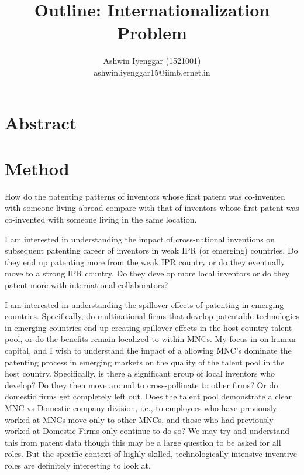 \documentclass[12pt]{article}
\begin{document}
\title{Outline: Internationalization Problem}
\author{Ashwin Iyenggar  (1521001) \\ ashwin.iyenggar15@iimb.ernet.in} 


\maketitle
\thispagestyle{empty}

\section{Abstract}


\section{Method}

How do the patenting patterns of inventors whose first patent was co-invented with someone living abroad compare with that of inventors whose first patent was co-invented with someone living in the same location.

I am interested in understanding the impact of cross-national inventions on subsequent patenting career of inventors in weak IPR (or emerging) countries. Do they end up patenting more from the weak IPR country or do they eventually move to a strong IPR country. Do they develop more local inventors or do they patent more with international collaborators?

I am interested in understanding the spillover effects of patenting in emerging countries. Specifically, do multinational firms that develop patentable technologies in emerging countries end up creating spillover effects in the host country talent pool, or do the benefits remain localized to within MNCs. My focus in on human capital, and I wish to understand the impact of a allowing MNC's dominate the patenting process in emerging markets on the quality of the talent pool in the host country. Specifically, is there a significant group of local inventors who develop? Do they then move around to cross-pollinate to other firms? Or do domestic firms get completely left out. Does the talent pool demonstrate a clear MNC vs Domestic company division, i.e., to employees who have previously worked at MNCs move only to other MNCs, and those who had previously worked at Domestic Firms only continue to do so? We may try and understand this from patent data though this may be a large question to be asked for all roles. But the specific context of highly skilled, technologically intensive inventive roles are definitely interesting to look at.
\end{document}
